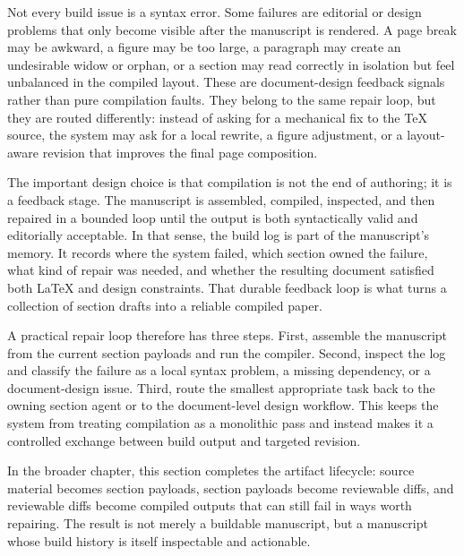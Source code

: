 \documentclass[11pt]{article}
\begin{document}
Not every build issue is a syntax error. Some failures are editorial or design problems that only become visible after the manuscript is rendered. A page break may be awkward, a figure may be too large, a paragraph may create an undesirable widow or orphan, or a section may read correctly in isolation but feel unbalanced in the compiled layout. These are document-design feedback signals rather than pure compilation faults. They belong to the same repair loop, but they are routed differently: instead of asking for a mechanical fix to the TeX source, the system may ask for a local rewrite, a figure adjustment, or a layout-aware revision that improves the final page composition.

The important design choice is that compilation is not the end of authoring; it is a feedback stage. The manuscript is assembled, compiled, inspected, and then repaired in a bounded loop until the output is both syntactically valid and editorially acceptable. In that sense, the build log is part of the manuscript's memory. It records where the system failed, which section owned the failure, what kind of repair was needed, and whether the resulting document satisfied both LaTeX and design constraints. That durable feedback loop is what turns a collection of section drafts into a reliable compiled paper.

A practical repair loop therefore has three steps. First, assemble the manuscript from the current section payloads and run the compiler. Second, inspect the log and classify the failure as a local syntax problem, a missing dependency, or a document-design issue. Third, route the smallest appropriate task back to the owning section agent or to the document-level design workflow. This keeps the system from treating compilation as a monolithic pass and instead makes it a controlled exchange between build output and targeted revision.

In the broader chapter, this section completes the artifact lifecycle: source material becomes section payloads, section payloads become reviewable diffs, and reviewable diffs become compiled outputs that can still fail in ways worth repairing. The result is not merely a buildable manuscript, but a manuscript whose build history is itself inspectable and actionable.
\end{document}
